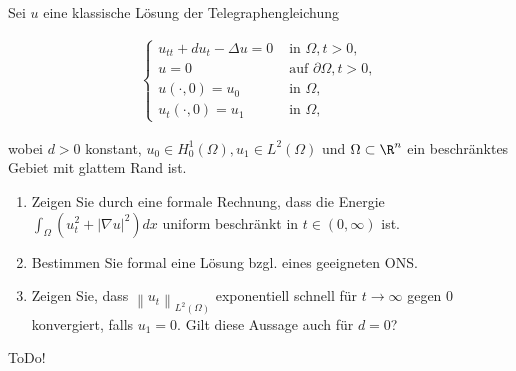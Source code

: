 
\begin{exercise}

Sei $u$ eine klassische Lösung der Telegraphengleichung

\begin{align*}
\begin{cases}
u_{t t}+d u_{t}-\Delta u=0 & \text { in } \Omega, t>0, \\
u=0 & \text { auf } \partial \Omega, t>0, \\
u(\cdot, 0)=u_{0} & \text { in } \Omega, \\
u_{t}(\cdot, 0)=u_{1} & \text { in } \Omega,
\end{cases}
\end{align*}

wobei $d>0$ konstant, $u_{0} \in H_{0}^{1}(\Omega), u_{1} \in L^{2}(\Omega)$ und $\Omega \subset \R^n$ ein beschränktes Gebiet mit glattem Rand ist.
\begin{enumerate}[label = (\roman*)]
\item Zeigen Sie durch eine formale Rechnung, dass die Energie $\int_{\Omega}\left(u_{t}^{2}+|\nabla u|^{2}\right) d x$ uniform beschränkt in $t \in(0, \infty)$ ist.
\item Bestimmen Sie formal eine Lösung bzgl. eines geeigneten ONS.
\item Zeigen Sie, dass $\left\|u_{t}\right\|_{L^{2}(\Omega)}$ exponentiell schnell für $t \rightarrow \infty$ gegen 0 konvergiert, falls $u_{1}=0 .$ Gilt diese Aussage auch für $d=0$?
\end{enumerate}
\end{exercise}


\begin{solution}

ToDo!

\end{solution}

